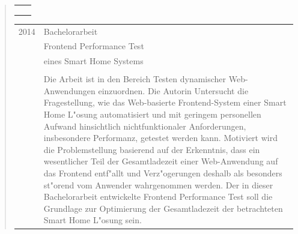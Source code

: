 \begin{quote}
\begin{tabular}{p{4cm}l}
\begin{minipage}{10cm}
		\end{minipage}\\\\\\
	\end{tabular}
%
	\begin{tabular}{p{4cm}l}
		2014&Bachelorarbeit\\
		&\qquad Frontend Performance Test\\
		&\qquad eines Smart Home Systems\\\\
		&\begin{minipage}{10cm}
		Die Arbeit ist in den Bereich Testen dynamischer Web-Anwendungen einzuordnen. Die Autorin Untersucht die Fragestellung, wie das Web-basierte Frontend-System einer Smart Home L"osung automatisiert und mit geringem personellen Aufwand hinsichtlich nichtfunktionaler Anforderungen, insbesondere Performanz, getestet werden kann. Motiviert wird die Problemstellung  basierend auf der Erkenntnis, dass ein wesentlicher Teil der Gesamtladezeit einer Web-Anwendung auf das Frontend entf"allt und Verz"ogerungen deshalb als besonders st"orend vom Anwender wahrgenommen werden. Der in dieser Bachelorarbeit entwickelte Frontend Performance Test soll die Grundlage zur Optimierung der Gesamtladezeit der betrachteten Smart Home L"osung sein.
		

\end{minipage}
\end{tabular}
\end{quote}
